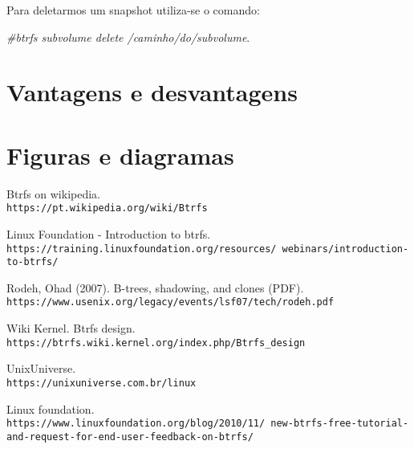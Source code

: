 \documentclass[12pt]{article}
\begin{document}
Para deletarmos um snapshot utiliza-se o comando:

\textit{#btrfs subvolume delete /caminho/do/subvolume}.

\section{Vantagens e desvantagens}

\section{Figuras e diagramas}\label{sec:figs}

\begin{thebibliography}{9}

Btrfs on wikipedia.
\\\texttt{https://pt.wikipedia.org/wiki/Btrfs}

Linux Foundation - Introduction to btrfs.
\\\texttt{https://training.linuxfoundation.org/resources/\
webinars/introduction-to-btrfs/}

Rodeh, Ohad (2007). B-trees, shadowing, and clones (PDF). 
\\\texttt{https://www.usenix.org/legacy/events/lsf07/tech/rodeh.pdf}

Wiki Kernel. Btrfs design.
\\\texttt{https://btrfs.wiki.kernel.org/index.php/Btrfs_design}

UnixUniverse.
\\\texttt{https://unixuniverse.com.br/linux}

Linux foundation.
\\\texttt{https://www.linuxfoundation.org/blog/2010/11/\
new-btrfs-free-tutorial-and-request-for-end-user-feedback-on-btrfs/}

\end{thebibliography}
\end{document}
